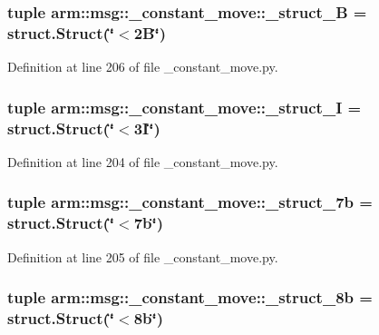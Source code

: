 \subsubsection[{\-\_\-struct\-\_\-2\-B}]{\setlength{\rightskip}{0pt plus 5cm}tuple {\bf arm\-::msg\-::\-\_\-constant\-\_\-move\-::\-\_\-struct\-\_\-B} = struct.\-Struct(\char`\"{}$<$2\-B\char`\"{})}\label{namespacearm_1_1msg_1_1__constant__move_a5e5e629cacfddf3455d3e7c0bc5a5938}


\-Definition at line 206 of file \-\_\-constant\-\_\-move.\-py.

\subsubsection[{\-\_\-struct\-\_\-3\-I}]{\setlength{\rightskip}{0pt plus 5cm}tuple {\bf arm\-::msg\-::\-\_\-constant\-\_\-move\-::\-\_\-struct\-\_\-I} = struct.\-Struct(\char`\"{}$<$3\-I\char`\"{})}\label{namespacearm_1_1msg_1_1__constant__move_a854a7f255e28bf57a620353f556c5da6}


\-Definition at line 204 of file \-\_\-constant\-\_\-move.\-py.

\subsubsection[{\-\_\-struct\-\_\-7b}]{\setlength{\rightskip}{0pt plus 5cm}tuple {\bf arm\-::msg\-::\-\_\-constant\-\_\-move\-::\-\_\-struct\-\_\-7b} = struct.\-Struct(\char`\"{}$<$7b\char`\"{})}\label{namespacearm_1_1msg_1_1__constant__move_ace47e59d8fd847c798af9e37560e1a51}


\-Definition at line 205 of file \-\_\-constant\-\_\-move.\-py.

\subsubsection[{\-\_\-struct\-\_\-8b}]{\setlength{\rightskip}{0pt plus 5cm}tuple {\bf arm\-::msg\-::\-\_\-constant\-\_\-move\-::\-\_\-struct\-\_\-8b} = struct.\-Struct(\char`\"{}$<$8b\char`\"{})}\label{namespacearm_1_1msg_1_1__constant__move_a37aab5a0a52c408a376729eb985059ba}


